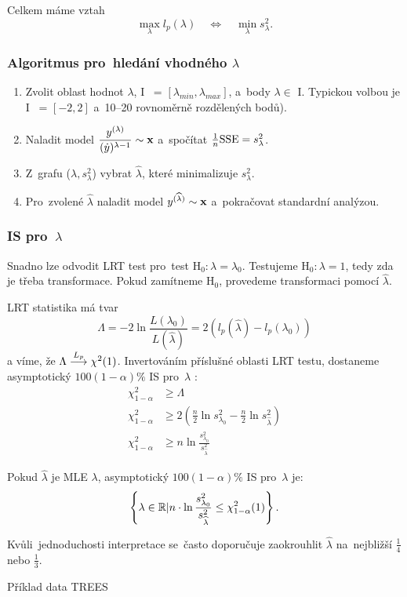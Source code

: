 Celkem máme vztah
$$ \max_{\lambda} l_p(\lambda) \quad \Leftrightarrow \quad \min_{\lambda} s_{\lambda}^2.$$

\subsubsection{Algoritmus pro~hledání vhodného $\lambda$}
\begin{enumerate}
\item Zvolit oblast hodnot $\lambda$, I~ = $[\lambda_{min}, \lambda_{max}]$, a~body $\lambda \in$ I. Typickou volbou je I~ = $[-2,2]$ a~10--20 rovnoměrně rozdělených bodů).
\item Naladit model $\dfrac{y^{(\lambda)}}{(\dot{y})^{\lambda-1}} \sim \mathbf{x}$ a~spočítat $\frac{1}{n}\mathrm{SSE} = s_{\lambda}^2$.
\item Z~grafu ($\lambda, s_{\lambda}^2$) vybrat $\widehat{\lambda}$, které minimalizuje $s_{\lambda}^2$.
\item Pro~zvolené $\widehat{\lambda}$ naladit model $y^{(\widehat{\lambda})} \sim \mathbf{x}$ a~pokračovat standardní analýzou.
\end{enumerate}

\subsubsection{IS pro~$\lambda$ }
Snadno lze odvodit LRT test pro~test $\text{H}_0 : \lambda = \lambda_0$. Testujeme $\text{H}_0 : \lambda = 1$, tedy zda je třeba transformace. Pokud zamítneme $\text{H}_0$, provedeme transformaci pomocí $\widehat{\lambda}$.

LRT statistika má tvar $$\Lambda = -2 \ln \frac{L(\lambda_0)}{L(\widehat{\lambda})} = 2 \left(l_p(\widehat{\lambda}) - l_p(\lambda_0)\right)$$ a víme, že $\Lambda \stackrel{L_p}{\longrightarrow} \chi^2(1)$. Invertováním příslušné oblasti LRT testu, dostaneme asymptotický $100(1-\alpha)\%$ IS pro~$\lambda$ :
\begin{align*}
 \chi^2_{1-\alpha} & \geq \Lambda \\
\chi^2_{1-\alpha} & \geq 2\left(\frac{n}{2}\ln s^2_{\lambda_0} - \frac{n}{2}\ln s^2_{\widehat{\lambda}}\right) \\
\chi^2_{1-\alpha} & \geq n \ln\frac{s^2_{\lambda_0}}{s^2_{\widehat{\lambda}}}
\end{align*}

Pokud $\widehat{\lambda}$ je MLE $\lambda$, asymptotický $100(1-\alpha)\%$ IS  pro~$\lambda$ je:
 $$
 \left\{ \lambda \in \mathbb{R} | n \cdot \ln\frac{s^2_{\lambda_0}}{s^2_{\widehat{\lambda}}} \leq \chi^2_{1-\alpha}(1) \right\}.
 $$
\begin{remark}
 Kvůli~jednoduchosti interpretace se~často doporučuje zaokrouhlit $\widehat{\lambda}$ na~nejbližší $\frac{1}{4}$ nebo $\frac{1}{3}$.
\end{remark}
\begin{example}
Příklad data TREES
\end{example}

